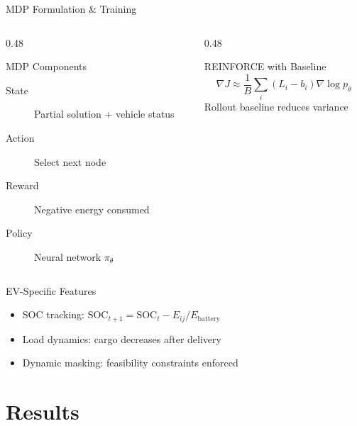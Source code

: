 \documentclass[aspectratio=169,11pt]{beamer}
\begin{document}
\begin{frame}{MDP Formulation \& Training}
    \begin{columns}[T]
        \begin{column}{0.48\textwidth}
            \begin{block}{MDP Components}
                \begin{description}
                    \item[State] Partial solution + vehicle status
                    \item[Action] Select next node
                    \item[Reward] Negative energy consumed
                    \item[Policy] Neural network $\pi_\theta$
                \end{description}
            \end{block}
        \end{column}
        \begin{column}{0.48\textwidth}
            \begin{block}{REINFORCE with Baseline}
                \[
                \nabla J \approx \frac{1}{B}\sum_{i} (L_i - b_i) \nabla \log p_\theta
                \]
                \small Rollout baseline reduces variance
            \end{block}
        \end{column}
    \end{columns}

    \vspace{0.4cm}
    \begin{block}{EV-Specific Features}
        \begin{itemize}
            \item SOC tracking: $\text{SOC}_{t+1} = \text{SOC}_t - E_{ij}/E_{\text{battery}}$
            \item Load dynamics: cargo decreases after delivery
            \item Dynamic masking: feasibility constraints enforced
        \end{itemize}
    \end{block}
\end{frame}

\section{Results}
\end{document}

